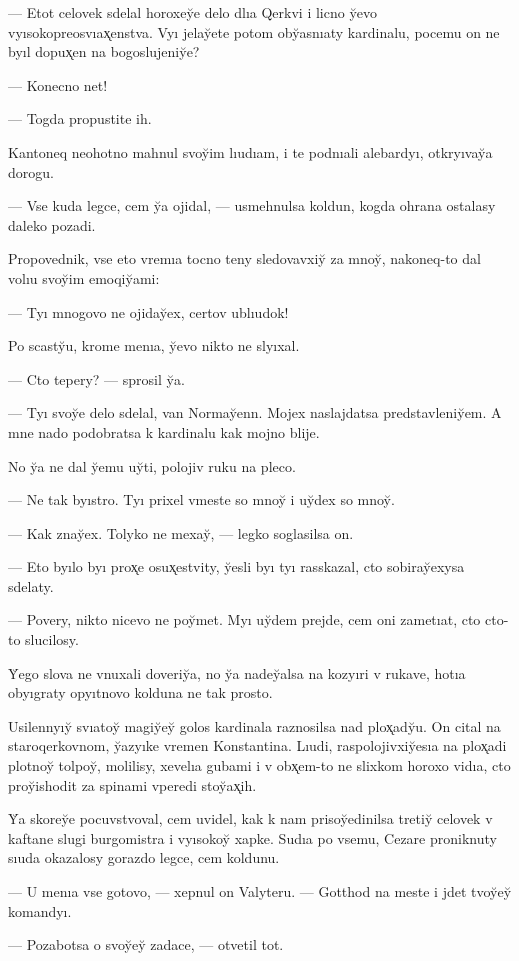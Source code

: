 \documentclass[10pt]{book}
\begin{document}
— Etot celovek sdelal horoxey̆e delo dlıa Qerkvi i licno y̆evo vyısokopreosvıax̨enstva. Vyı jelay̆ete potom oby̆asnıaty kardinalu, pocemu on ne byıl dopux̨en na bogoslujeniy̆e?

— Konecno net!

— Togda propustite ih.

Kantoneq neohotno mahnul svoy̆im lıudıam, i te podnıali alebardyı, otkryıvay̆a dorogu.

— Vse kuda legce, cem y̆a ojidal, — usmehnulsa koldun, kogda ohrana ostalasy daleko pozadi.

Propovednik, vse eto vremıa tocno teny sledovavxiy̆ za mnoy̆, nakoneq-to dal volıu svoy̆im emoqiy̆ami:

— Tyı mnogovo ne ojiday̆ex, certov ublıudok!

Po scasty̆u, krome menıa, y̆evo nikto ne slyıxal.

— Cto tepery? — sprosil y̆a.

— Tyı svoy̆e delo sdelal, van Normay̆enn. Mojex naslajdatsa predstavleniy̆em. A mne nado podobratsa k kardinalu kak mojno blije.

No y̆a ne dal y̆emu uy̆ti, polojiv ruku na pleco.

— Ne tak byıstro. Tyı prixel vmeste so mnoy̆ i uy̆dex so mnoy̆.

— Kak znay̆ex. Tolyko ne mexay̆, — legko soglasilsa on.

— Eto byılo byı prox̨e osux̨estvity, y̆esli byı tyı rasskazal, cto sobiray̆exysa sdelaty.

— Povery, nikto nicevo ne poy̆met. Myı uy̆dem prejde, cem oni zametıat, cto cto-to slucilosy.

Y̆ego slova ne vnuxali doveriy̆a, no y̆a nadey̆alsa na kozyıri v rukave, hotıa obyıgraty opyıtnovo kolduna ne tak prosto.

Usilennyıy̆ svıatoy̆ magiy̆ey̆ golos kardinala raznosilsa nad plox̨ady̆u. On cital na staroqerkovnom, y̆azyıke vremen Konstantina. Lıudi, raspolojivxiy̆esıa na plox̨adi plotnoy̆ tolpoy̆, molilisy, xevelıa gubami i v obx̨em-to ne slixkom horoxo vidıa, cto proy̆ishodit za spinami vperedi stoy̆ax̨ih.

Y̆a skorey̆e pocuvstvoval, cem uvidel, kak k nam prisoy̆edinilsa tretiy̆ celovek v kaftane slugi burgomistra i vyısokoy̆ xapke. Sudıa po vsemu, Cezare proniknuty sıuda okazalosy gorazdo legce, cem koldunu.

— U menıa vse gotovo, — xepnul on Valyteru. — Gotthod na meste i jdet tvoy̆ey̆ komandyı.

— Pozabotsa o svoy̆ey̆ zadace, — otvetil tot.
\end{document}
